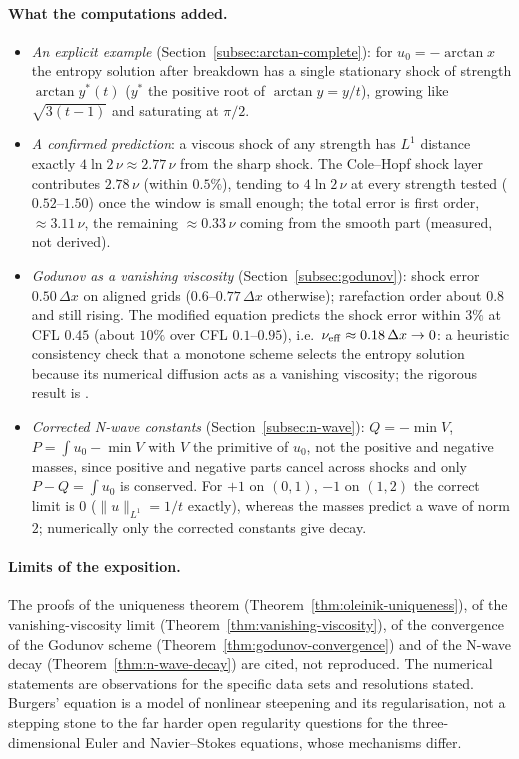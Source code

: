 \paragraph{What the computations added.}
\begin{itemize}
  \item \emph{An explicit example} (Section~\ref{subsec:arctan-complete}): for
    $u_0=-\arctan x$ the entropy solution after breakdown has a single
    stationary shock of strength $\arctan y^*(t)$ ($y^*$ the positive root of
    $\arctan y=y/t$), growing like $\sqrt{3(t-1)}$ and saturating at $\pi/2$.
  \item \emph{A confirmed prediction}: a viscous shock of any strength has
    $L^1$ distance exactly $4\ln2\,\nu\approx2.77\,\nu$ from the sharp shock. The
    Cole--Hopf shock layer contributes $2.78\,\nu$ (within $0.5\%$), tending to
    $4\ln2\,\nu$ at every strength tested ($0.52$--$1.50$) once the window is
    small enough; the total error is first order, $\approx3.11\,\nu$, the
    remaining $\approx0.33\,\nu$ coming from the smooth part (measured, not
    derived).
  \item \emph{Godunov as a vanishing viscosity} (Section~\ref{subsec:godunov}):
    shock error $0.50\,\Delta x$ on aligned grids ($0.6$--$0.77\,\Delta x$
    otherwise); rarefaction order about $0.8$ and still rising. The modified
    equation predicts the shock error within $3\%$ at CFL $0.45$ (about $10\%$ over
    CFL $0.1$--$0.95$), i.e.\ $\nu_{\rm eff}\approx0.18\,\Delta x\to0$: a heuristic
    consistency check that a monotone scheme selects the entropy solution
    because its numerical diffusion acts as a vanishing viscosity; the
    rigorous result is \cite{crandall1980}.
  \item \emph{Corrected N-wave constants} (Section~\ref{subsec:n-wave}): $Q=-\min V$,
    $P=\int u_0-\min V$ with $V$ the primitive of $u_0$, not the positive and
    negative masses, since positive and negative parts cancel across shocks and
    only $P-Q=\int u_0$ is conserved. For $+1$ on $(0,1)$, $-1$ on $(1,2)$ the
    correct limit is $0$ ($\|u\|_{L^1}=1/t$ exactly), whereas the masses predict a
    wave of norm $2$; numerically only the corrected constants give decay.
\end{itemize}

\paragraph{Limits of the exposition.}
The proofs of the uniqueness theorem (Theorem~\ref{thm:oleinik-uniqueness}),
of the vanishing-viscosity limit (Theorem~\ref{thm:vanishing-viscosity}), of
the convergence of the Godunov scheme (Theorem~\ref{thm:godunov-convergence})
and of the N-wave decay (Theorem~\ref{thm:n-wave-decay}) are cited, not
reproduced. The numerical statements are observations for the specific data
sets and resolutions stated. Burgers' equation is a model of nonlinear
steepening and its regularisation, not a stepping stone to the far harder
open regularity questions for the three-dimensional Euler and Navier--Stokes
equations, whose mechanisms differ.

